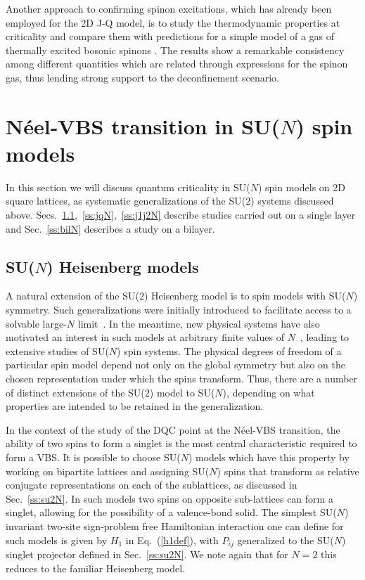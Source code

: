 \documentclass[range]{ar2e}
\begin{document}
Another approach to confirming spinon excitations, which has already been employed for the 2D J-Q model, is to study the thermodynamic properties at 
criticality and compare them with predictions for a simple model of a gas of thermally excited bosonic spinons \cite{Sandvik11a}. The results show a remarkable 
consistency among different quantities which are related through expressions for the spinon gas, thus lending strong support to the deconfinement scenario.

\section{N\'eel-VBS transition in SU($N$) spin models}
\label{sec:sunmodels}

In this section we will discuss quantum criticality in SU($N$) spin models on 2D square lattices, as systematic generalizations of the SU($2$) systems 
discussed above. Secs.~\ref{ss:j1N},~\ref{ss:jqN},~\ref{ss:j1j2N} describe studies carried out on a single layer and Sec.~\ref{ss:bilN} describes a study 
on a bilayer. 

\subsection{SU($N$) Heisenberg models}
\label{ss:j1N}
A natural extension of the SU($2$) Heisenberg model is to spin models with SU($N$) symmetry. Such generalizations were initially introduced to
facilitate access to a solvable large-$N$ limit~\cite{affleck1985:lgN,Read89}. In the meantime, new physical systems have also motivated an interest 
in such models at arbitrary finite values of $N$~\cite{gorshkov2010:sun,kugel1982:kk}, leading to extensive studies of SU($N$) spin systems. The 
physical degrees of freedom of a particular spin model depend not only on the global symmetry but also on the chosen representation under which the 
spins transform. Thus, there are a number of distinct extensions of the SU($2$) model to SU($N$), depending on what properties are intended to be retained 
in the generalization. 

In the context of the study of the DQC point at the N\'eel-VBS transition, the ability of two spins to form a singlet is the most
central characteristic required to form a VBS. It is possible to choose SU($N$) models which have this property by working on bipartite lattices and
assigning SU($N$) spins that transform as relative conjugate representations on each of the sublattices, as discussed in Sec.~\ref{ss:su2N}. In such 
models two spins on opposite sub-lattices can form a singlet, allowing for the possibility of a valence-bond solid.  The simplest 
SU($N$) invariant two-site sign-problem free Hamiltonian interaction one can define for such models is given by $H_1$ in Eq.~(\ref{h1def}), with $P_{ij}$ 
generalized to the SU($N$) singlet projector defined in Sec.~\ref{ss:su2N}. We note again that for $N=2$ this reduces to the familiar Heisenberg model. 
\end{document}
